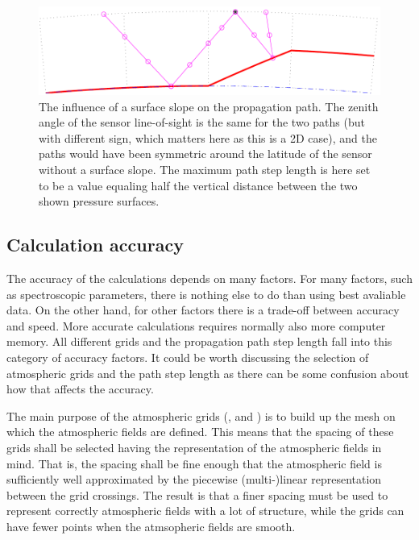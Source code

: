 \begin{figure}[!p]
 \begin{center}
  \includegraphics*[width=0.95\hsize]{Figs/fm_definitions/ppath_ground}
  \caption{The influence of a surface slope on the propagation path. The zenith
    angle of the sensor line-of-sight is the same for the two paths (but with
    different sign, which matters here as this is a 2D case), and the paths
    would have been symmetric around the latitude of the sensor without a 
    surface slope. The maximum path step length is here set to be a value
    equaling half the vertical distance between the two shown pressure
    surfaces.}
  \label{fig:fm_defs:ppath_surface}
 \end{center}
\end{figure}



\subsection{Calculation accuracy}
\label{sec:fm_defs:accuracy}

The accuracy of the calculations depends on many factors. For many
factors, such as spectroscopic parameters, there is nothing else to do
than using best avaliable data. On the other hand, for other factors
there is a trade-off between accuracy and speed. More accurate
calculations requires normally also more computer memory. All
different grids and the propagation path step length fall into this
category of accuracy factors. It could be worth discussing the
selection of atmospheric grids and the path step length as there can
be some confusion about how that affects the accuracy.

The main purpose of the atmospheric grids (,
 and ) is to build up the
mesh on which the atmospheric fields are defined. This means that the
spacing of these grids shall be selected having the representation of
the atmospheric fields in mind. That is, the spacing shall be fine
enough that the atmospheric field is sufficiently well approximated by
the piecewise (multi-)linear representation between the grid
crossings. The result is that a finer spacing must be used to
represent correctly atmospheric fields with a lot of structure, while
the grids can have fewer points when the atmsopheric fields are
smooth. 

